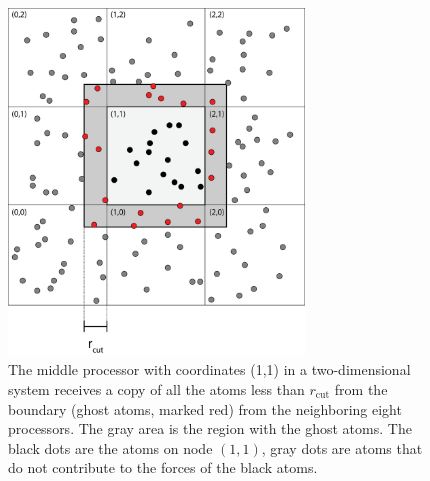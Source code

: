 \begin{figure}[h]
\begin{center}
\includegraphics[width=0.7\textwidth, trim=0cm 0cm 0cm 0cm, clip]{MD/figures/parallelization_ghost_atoms.eps}
\end{center}
\caption{The middle processor with coordinates (1,1) in a two-dimensional system receives a copy of all the atoms less than $r_\text{cut}$ from the boundary (ghost atoms, marked red) from the neighboring eight processors. The gray area is the region with the ghost atoms. The black dots are the atoms on node $(1,1)$, gray dots are atoms that do not contribute to the forces of the black atoms.}
\label{fig:md_ghost_atoms}
\end{figure}
\newpage
